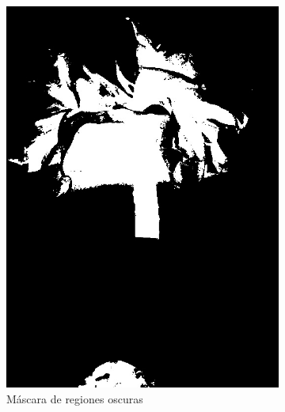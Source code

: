 \begin{figure}[H]
\centering
\begin{subfigure}[b]{0.48\textwidth}
    \centering
    \includegraphics[width=\textwidth]{imagenes/clasificador_3_negro.jpg}
    \caption{Máscara de regiones oscuras}
\end{subfigure}
\hfill
\begin{subfigure}[b]{0.48\textwidth}
    \centering

\end{subfigure}
\end{figure}
